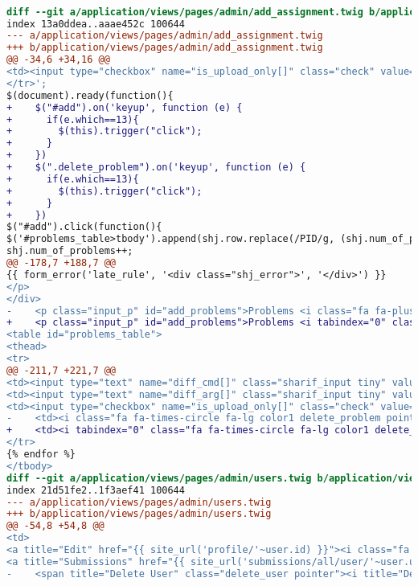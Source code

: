 \begin{itemize}
\begin{lstlisting}[language=diff, caption=Perubahan untuk mematuhi kriteria 2.1.1, label=lst_2.1.1, basicstyle=\ttfamily, frame=single,
columns=fullflexible, keepspaces=true, breaklines=true]

diff --git a/application/views/pages/admin/add_assignment.twig b/application/views/pages/admin/add_assignment.twig
index 13a0ddea..aaae452c 100644
--- a/application/views/pages/admin/add_assignment.twig
+++ b/application/views/pages/admin/add_assignment.twig
@@ -34,6 +34,16 @@
<td><input type="checkbox" name="is_upload_only[]" class="check" value="PID"/><td><i class="fa fa-times-circle fa-lg color1 delete_problem pointer"></i></td></td>\
</tr>';
$(document).ready(function(){
+    $("#add").on('keyup', function (e) {
+      if(e.which==13){
+        $(this).trigger("click");
+      }
+    })
+    $(".delete_problem").on('keyup', function (e) {
+      if(e.which==13){
+        $(this).trigger("click");
+      }
+    })
$("#add").click(function(){
$('#problems_table>tbody').append(shj.row.replace(/PID/g, (shj.num_of_problems+1)));
shj.num_of_problems++;
@@ -178,7 +188,7 @@
{{ form_error('late_rule', '<div class="shj_error">', '</div>') }}
</p>
</div>
-    <p class="input_p" id="add_problems">Problems <i class="fa fa-plus-circle fa-lg color11 pointer" id="add"></i>
+    <p class="input_p" id="add_problems">Problems <i tabindex="0" class="fa fa-plus-circle fa-lg color11 pointer" id="add"></i>
<table id="problems_table">
<thead>
<tr>
@@ -211,7 +221,7 @@
<td><input type="text" name="diff_cmd[]" class="sharif_input tiny" value="{{ problem.diff_cmd }}"/></td>
<td><input type="text" name="diff_arg[]" class="sharif_input tiny" value="{{ problem.diff_arg }}"/></td>
<td><input type="checkbox" name="is_upload_only[]" class="check" value="{{ problem.id }}" {{ problem.is_upload_only ? 'checked' }}/></td>
-    <td><i class="fa fa-times-circle fa-lg color1 delete_problem pointer"></i></td>
+    <td><i tabindex="0" class="fa fa-times-circle fa-lg color1 delete_problem pointer"></i></td>
</tr>
{% endfor %}
</tbody>
diff --git a/application/views/pages/admin/users.twig b/application/views/pages/admin/users.twig
index 21d51fe2..1f3aef41 100644
--- a/application/views/pages/admin/users.twig
+++ b/application/views/pages/admin/users.twig
@@ -54,8 +54,8 @@
<td>
<a title="Edit" href="{{ site_url('profile/'~user.id) }}"><i class="fa fa-pencil fa-lg color9"></i></a>
<a title="Submissions" href="{{ site_url('submissions/all/user/'~user.username) }}"><i class="fa fa-bars fa-lg color12"></i></a>
-    <span title="Delete User" class="delete_user pointer"><i title="Delete User" class="fa fa-times fa-lg color2"></i></span>

\end{lstlisting}
\end{itemize}
